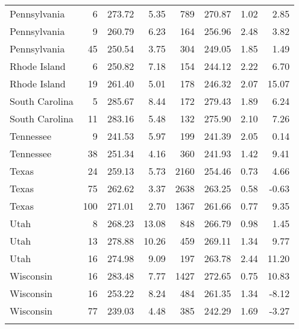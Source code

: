 \begin{longtable}{lrrr@{\extracolsep{10pt}}rrrr}
  Pennsylvania &   6 & 273.72 & 5.35 & 789 & 270.87 & 1.02 & 2.85 \\ 
  Pennsylvania &   9 & 260.79 & 6.23 & 164 & 256.96 & 2.48 & 3.82 \\ 
  Pennsylvania &  45 & 250.54 & 3.75 & 304 & 249.05 & 1.85 & 1.49 \\ 
  Rhode Island &   6 & 250.82 & 7.18 & 154 & 244.12 & 2.22 & 6.70 \\ 
  Rhode Island &  19 & 261.40 & 5.01 & 178 & 246.32 & 2.07 & 15.07 \\ 
  South Carolina &   5 & 285.67 & 8.44 & 172 & 279.43 & 1.89 & 6.24 \\ 
  South Carolina &  11 & 283.16 & 5.48 & 132 & 275.90 & 2.10 & 7.26 \\ 
  Tennessee &   9 & 241.53 & 5.97 & 199 & 241.39 & 2.05 & 0.14 \\ 
  Tennessee &  38 & 251.34 & 4.16 & 360 & 241.93 & 1.42 & 9.41 \\ 
  Texas &  24 & 259.13 & 5.73 & 2160 & 254.46 & 0.73 & 4.66 \\ 
  Texas &  75 & 262.62 & 3.37 & 2638 & 263.25 & 0.58 & -0.63 \\ 
  Texas & 100 & 271.01 & 2.70 & 1367 & 261.66 & 0.77 & 9.35 \\ 
  Utah &   8 & 268.23 & 13.08 & 848 & 266.79 & 0.98 & 1.45 \\ 
  Utah &  13 & 278.88 & 10.26 & 459 & 269.11 & 1.34 & 9.77 \\ 
  Utah &  16 & 274.98 & 9.09 & 197 & 263.78 & 2.44 & 11.20 \\ 
  Wisconsin &  16 & 283.48 & 7.77 & 1427 & 272.65 & 0.75 & 10.83 \\ 
  Wisconsin &  16 & 253.22 & 8.24 & 484 & 261.35 & 1.34 & -8.12 \\ 
  Wisconsin &  77 & 239.03 & 4.48 & 385 & 242.29 & 1.69 & -3.27 \\ 
   \hline
\hline
\label{g8readinglrlevel1}
\end{longtable}
